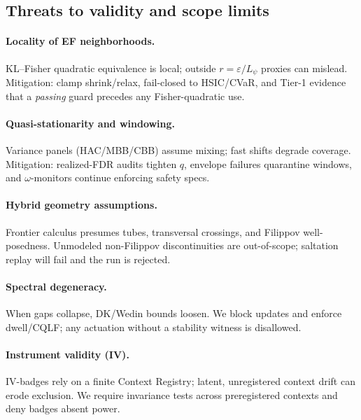 \subsection{Threats to validity and scope limits}\label{subsec:limits}
\emph{}

\paragraph{Locality of EF neighborhoods.}
KL–Fisher quadratic equivalence is local; outside $r=\varepsilon/L_\psi$ proxies can mislead. Mitigation: clamp shrink/relax, fail-closed to HSIC/CVaR, and Tier-1 evidence that a \emph{passing} guard precedes any Fisher-quadratic use.

\paragraph{Quasi-stationarity and windowing.}
Variance panels (HAC/MBB/CBB) assume mixing; fast shifts degrade coverage. Mitigation: realized-FDR audits tighten $q$, envelope failures quarantine windows, and $\omega$-monitors continue enforcing safety specs.

\paragraph{Hybrid geometry assumptions.}
Frontier calculus presumes tubes, transversal crossings, and Filippov well-posedness. Unmodeled non-Filippov discontinuities are out-of-scope; saltation replay will fail and the run is rejected.

\paragraph{Spectral degeneracy.}
When gaps collapse, DK/Wedin bounds loosen. We block updates and enforce dwell/CQLF; any actuation without a stability witness is disallowed.

\paragraph{Instrument validity (IV).}
IV-badges rely on a finite Context Registry; latent, unregistered context drift can erode exclusion. We require invariance tests across preregistered contexts and deny badges absent power.

